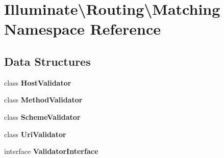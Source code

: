 \section{Illuminate\textbackslash{}Routing\textbackslash{}Matching Namespace Reference}
\label{namespace_illuminate_1_1_routing_1_1_matching}
\subsection*{Data Structures}
\begin{DoxyCompactItemize}
\item 
class {\bf Host\+Validator}
\item 
class {\bf Method\+Validator}
\item 
class {\bf Scheme\+Validator}
\item 
class {\bf Uri\+Validator}
\item 
interface {\bf Validator\+Interface}
\end{DoxyCompactItemize}
